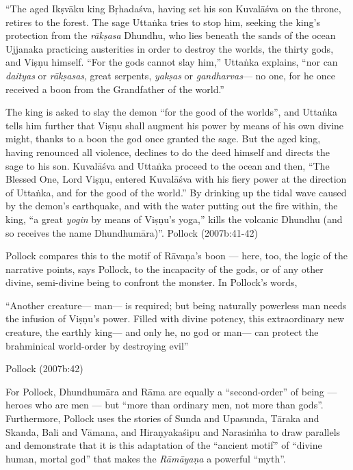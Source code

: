 \begin{myquote}
“The aged Ikṣvāku king Bṛhadaśva, having set his son Kuvalāśva on the throne, retires to the forest. The sage Uttaṅka tries to stop him, seeking the king’s protection from the {\sl rākṣasa} Dhundhu, who lies beneath the sands of the ocean Ujjanaka practicing austerities in order to destroy the worlds, the thirty gods, and Viṣṇu himself. “For the gods cannot slay him,” Uttaṅka explains, “nor can {\sl daityas} or {\sl rākṣasas}, great serpents, {\sl yakṣas} or {\sl gandharvas}--- no one, for he once received a boon from the  Grandfather of the world.”

The king is asked to slay the demon “for the good of the worlds”, and Uttaṅka tells him further that Viṣṇu shall augment his power by means of his own divine might, thanks to a boon the god once granted the sage. But the aged king, having renounced all violence, declines to do the deed himself and directs the sage to his son. Kuvalāśva and Uttaṅka proceed to the ocean and then, “The Blessed One, Lord Viṣṇu, entered Kuvalāśva with his fiery power at the direction of Uttaṅka, and for the good of the world.” By drinking up the tidal wave caused by the demon’s earthquake, and with the water putting out the fire within, the king, “a great {\sl yogin} by means of Viṣṇu’s yoga,” kills the volcanic Dhundhu (and so receives the name Dhundhumāra)”.
\hfill Pollock (2007b:41-42)
\end{myquote}

Pollock compares this to the motif of Rāvaṇa’s boon --- here, too, the logic of the narrative points, says Pollock, to the incapacity of the gods, or of any other divine, semi-divine being to confront the monster. In Pollock’s words,

\begin{myquote}
“Another creature--- man--- is required; but being naturally powerless man needs the infusion of Viṣṇu’s power. Filled with divine potency, this extraordinary new creature, the earthly king--- and only he, no god or man--- can protect the brahminical world-order by destroying evil”

\hfill Pollock (2007b:42)
\end{myquote}

For Pollock, Dhundhumāra and Rāma are equally a “second-order” of being --- heroes who are men --- but “more than ordinary men, not more than gods”. Furthermore, Pollock uses the stories of Sunda and Upasunda, Tāraka and Skanda, Bali and Vāmana, and Hiraṇyakaśipu and Narasiṁha to draw parallels and demonstrate that it is this adaptation of the “ancient motif” of “divine human, mortal god” that makes the {\sl Rāmāyaṇa} a powerful “myth”. 

